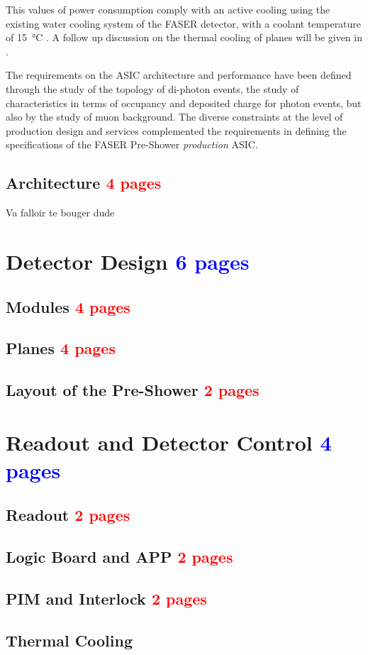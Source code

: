 		This values of power consumption comply with an active cooling using the existing water cooling system of the FASER detector, with a coolant temperature of \SI{15}{\celsius} \cite{PreShower_TP}. A follow up discussion on the thermal cooling of planes will be given in .
		
		
		The requirements on the ASIC architecture and performance have been defined through the study of the topology of di-photon events, the study of characteristics in terms of occupancy and deposited charge for photon events, but also by the study of muon background. The diverse constraints at the level of production design and services complemented the requirements in defining the specifications of the FASER Pre-Shower \textit{production} ASIC.   
		
		
		\subsection{Architecture \textcolor{red}{ 4 pages}}
		
		Va falloir te bouger dude 
		
		
		
		
		
		
		
		
		
		
		
		
		
	\clearpage
	\section{Detector Design \textcolor{blue}{ 6 pages}}
		\subsection{Modules \textcolor{red}{ 4 pages}}
		\subsection{Planes \textcolor{red}{ 4 pages}}
		\subsection{Layout of the Pre-Shower  \textcolor{red}{ 2 pages}}
		
	\clearpage	
	\section{Readout and Detector Control  \textcolor{blue}{ 4 pages}}
		\subsection{Readout \textcolor{red}{ 2 pages}}
		\subsection{Logic Board and APP \textcolor{red}{ 2 pages}}
		\subsection{PIM and Interlock \textcolor{red}{ 2 pages}}
		\subsection{Thermal Cooling}